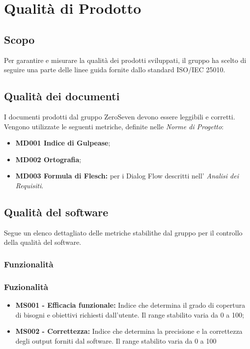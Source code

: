 \chapter{Qualità di Prodotto}
\section{Scopo}
Per garantire e misurare la qualità dei prodotti sviluppati, il gruppo ha scelto di seguire una parte delle linee guida fornite dallo standard ISO/IEC 25010.
\section{Qualità dei documenti}
I documenti prodotti dal gruppo ZeroSeven devono essere leggibili e corretti. Vengono utilizzate le seguenti metriche, definite nelle \textit{Norme di Progetto}:
\begin{itemize}
    \item \textbf{MD001 Indice di Gulpease};
    \item \textbf{MD002 Ortografia};
    \item \textbf{MD003 Formula di Flesch:} per i Dialog Flow descritti nell' \textit{Analisi dei Requisiti}.
\end{itemize}
\section{Qualità del software}
Segue un elenco dettagliato delle metriche stabilithe dal gruppo per il controllo della qualità del software.

\subsection{Funzionalità}
\subsection{Fuzionalità}
\begin{itemize}
	\item \textbf{MS001 - Efficacia funzionale:} Indice che determina il grado di copertura di bisogni e obiettivi richiesti dall'utente. Il range stabilito varia da 0 a 100;
	\item \textbf{MS002 - Correttezza:} Indice che determina la precisione e la correttezza degli output forniti dal software. Il range stabilito varia da 0 a 100
	\end{itemize}

